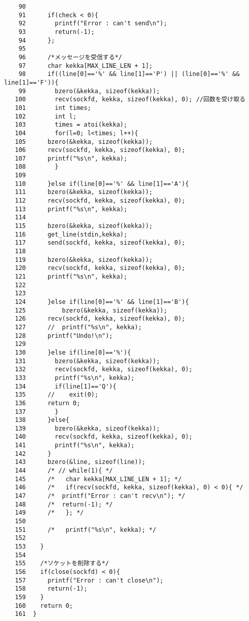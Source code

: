 \documentclass[a4j]{jarticle}
\begin{document}
\begin{verbatim}
    90	
    91	    if(check < 0){
    92	      printf("Error : can't send\n");
    93	      return(-1);
    94	    };
    95	
    96	    /*メッセージを受信する*/
    97	    char kekka[MAX_LINE_LEN + 1];
    98	    if((line[0]=='%' && line[1]=='P') || (line[0]=='%' && line[1]=='F')){
    99	      bzero(&kekka, sizeof(kekka));
   100	      recv(sockfd, kekka, sizeof(kekka), 0); //回数を受け取る
   101	      int times;
   102	      int l;
   103	      times = atoi(kekka);
   104	      for(l=0; l<times; l++){
   105		bzero(&kekka, sizeof(kekka));
   106		recv(sockfd, kekka, sizeof(kekka), 0);
   107		printf("%s\n", kekka);
   108	      }
   109	
   110	    }else if(line[0]=='%' && line[1]=='A'){
   111		bzero(&kekka, sizeof(kekka));
   112		recv(sockfd, kekka, sizeof(kekka), 0);
   113		printf("%s\n", kekka);
   114	
   115		bzero(&kekka, sizeof(kekka));
   116		get_line(stdin,kekka);
   117		send(sockfd, kekka, sizeof(kekka), 0);
   118	
   119		bzero(&kekka, sizeof(kekka));
   120		recv(sockfd, kekka, sizeof(kekka), 0);
   121		printf("%s\n", kekka);
   122	
   123	
   124	    }else if(line[0]=='%' && line[1]=='B'){
   125	      	bzero(&kekka, sizeof(kekka));
   126		recv(sockfd, kekka, sizeof(kekka), 0);
   127		//	printf("%s\n", kekka);
   128		printf("Undo!\n");
   129	
   130	    }else if(line[0]=='%'){
   131	      bzero(&kekka, sizeof(kekka));
   132	      recv(sockfd, kekka, sizeof(kekka), 0);
   133	      printf("%s\n", kekka);
   134	      if(line[1]=='Q'){
   135		//	  exit(0);
   136		return 0;
   137	      }
   138	    }else{
   139	      bzero(&kekka, sizeof(kekka));
   140	      recv(sockfd, kekka, sizeof(kekka), 0);
   141	      printf("%s\n", kekka);
   142	    }
   143	    bzero(&line, sizeof(line));
   144	    /* // while(1){ */
   145	    /*   char kekka[MAX_LINE_LEN + 1]; */
   146	    /*   if(recv(sockfd, kekka, sizeof(kekka), 0) < 0){ */
   147	    /* 	printf("Error : can't recv\n"); */
   148	    /* 	return(-1); */
   149	    /*   }; */
   150	
   151	    /*   printf("%s\n", kekka); */
   152	
   153	  }
   154	
   155	  /*ソケットを削除する*/
   156	  if(close(sockfd) < 0){
   157	    printf("Error : can't close\n");
   158	    return(-1);
   159	  }
   160	  return 0;
   161	}
\end{verbatim}

\newpage
\end{document}
